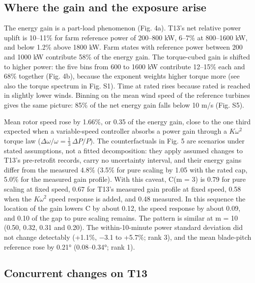 \documentclass[preprint,12pt]{elsarticle}
\begin{document}
\subsection{Where the gain and the exposure arise}

The energy gain is a part-load phenomenon (Fig. 4a). T13's net relative power uplift is 10--11\% for farm reference power of 200--800 kW, 6--7\% at 800--1600 kW, and below 1.2\% above 1800 kW. Farm states with reference power between 200 and 1000 kW contribute 58\% of the energy gain. The torque-cubed gain is shifted to higher power: the five bins from 600 to 1600 kW contribute 12--15\% each and 68\% together (Fig. 4b), because the exponent weights higher torque more (see also the torque spectrum in Fig. S1). Time at rated rises because rated is reached in slightly lower winds. Binning on the mean wind speed of the reference turbines gives the same picture: 85\% of the net energy gain falls below 10 m/s (Fig. S5).

Mean rotor speed rose by 1.66\%, or 0.35 of the energy gain, close to the one third expected when a variable-speed controller absorbs a power gain through a \(K\omega^2\) torque law (\(\Delta\omega/\omega = \tfrac{1}{3}\,\Delta P/P\)). The counterfactuals in Fig. 5 are scenarios under stated assumptions, not a fitted decomposition: they apply assumed changes to T13's pre-retrofit records, carry no uncertainty interval, and their energy gains differ from the measured 4.8\% (3.5\% for pure scaling by 1.05 with the rated cap, 5.0\% for the measured gain profile). With this caveat, C(m = 3) is 0.79 for pure scaling at fixed speed, 0.67 for T13's measured gain profile at fixed speed, 0.58 when the \(K\omega^2\) speed response is added, and 0.48 measured. In this sequence the location of the gain lowers C by about 0.12, the speed response by about 0.09, and 0.10 of the gap to pure scaling remains. The pattern is similar at m = 10 (0.50, 0.32, 0.31 and 0.20). The within-10-minute power standard deviation did not change detectably (+1.1\%, −3.1 to +5.7\%; rank 3), and the mean blade-pitch reference rose by 0.21° (0.08--0.34°; rank 1).

\subsection{Concurrent changes on T13}
\end{document}
